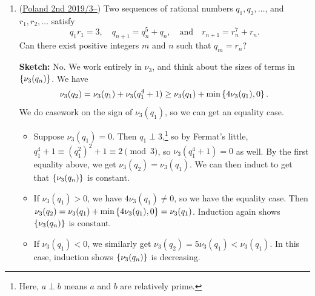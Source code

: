 \documentclass[11pt,paper=letter]{scrartcl}
\begin{document}
\begin{enumerate}
\begin{itemize}
\item Suppose all were distinct. This gives the equality case: $0 \le \nu_p(a/b + b/c + c/a) = \min\cbr{x-y, y-z, z-x}$. As the three integers sum to $0$, if they're all distinct, one of them must be negative. Then their minimum would be negative, contradicting the fact that $\nu_p(a/b + b/c + c/a) \ge 0$.

\item Otherwise, two of them are equal. WLOG $x-y = y-z$. Then $x + y + z = 3y$, which is divisible by $3$, as desired.

\end{itemize}

\textbf{Remark:} In general, an equality case of the sum rule is much more useful, and it's usually worth doing casework to make it happen.

\item (\href{https://artofproblemsolving.com/community/c6h1871281p12694557}{Poland 2nd 2019/3--}) Two sequences of rational numbers $q_1, q_2, \ldots$, and $r_1, r_2, \ldots$ satisfy \[
  q_1r_1 = 3, \quad
  q_{n+1} = q_n^5 + q_n, \quad \text{and} \quad
  r_{n+1} = r_n^7 + r_n.
\]
Can there exist positive integers $m$ and $n$ such that $q_m = r_n$?

\textbf{Sketch:} No. We work entirely in $\nu_3$, and think about the sizes of terms in $\left\{ \nu_3(q_n) \right\}$. We have \[
  \nu_3(q_2) = \nu_3(q_1) + \nu_3(q_1^4 + 1) \ge \nu_3(q_1) + \min\left\{ 4\nu_3(q_1), 0 \right\}.
\]
We do casework on the sign of $\nu_3(q_1)$, so we can get an equality case.

\begin{itemize}

\item Suppose $\nu_3(q_1) = 0$. Then $q_1 \perp 3$,\footnote{Here, $a \perp b$ means $a$ and $b$ are relatively prime.} so by Fermat's little, $q_1^4 + 1 \equiv (q_1^2)^2 + 1 \equiv 2 \pmod 3$, so $\nu_3(q_1^4 + 1) = 0$ as well. By the first equality above, we get $\nu_3(q_2) = \nu_3(q_1)$. We can then induct to get that $\left\{ \nu_3(q_n) \right\}$ is constant.

\item If $\nu_3(q_1) > 0$, we have $4\nu_3(q_1) \ne 0$, so we have the equality case. Then $\nu_3(q_2) = \nu_3(q_1) + \min\left\{ 4\nu_3(q_1), 0 \right\} = \nu_3(q_1)$. Induction again shows $\left\{ \nu_3(q_n) \right\}$ is constant.

\item If $\nu_3(q_1) < 0$, we similarly get $\nu_3(q_2) = 5\nu_3(q_1) < \nu_3(q_1)$. In this case, induction shows $\left\{ \nu_3(q_n) \right\}$ is decreasing.


\end{itemize}
\end{enumerate}
\end{document}
